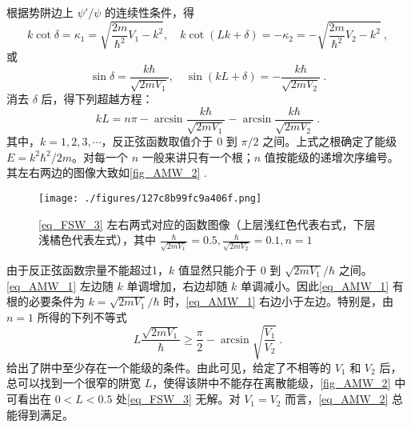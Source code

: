 根据势阱边上 $\psi'/\psi$ 的连续性条件，得
\begin{equation}
k\cot\delta=\kappa_1=\sqrt{\frac{2m}{\hbar^2}V_1-k^2},\quad k\cot(Lk+\delta)=-\kappa_2=-\sqrt{\frac{2m}{\hbar^2}V_2-k^2}~,
\end{equation}
或
\begin{equation}
\sin\delta=\frac{k\hbar}{\sqrt{2mV_1}},\quad\sin(kL+\delta)=-\frac{k\hbar}{\sqrt{2mV_2}}~.
\end{equation}
消去 $\delta$ 后，得下列超越方程：
\begin{equation}\label{eq_AMW_1}
kL=n\pi-\arcsin\frac{k\hbar}{\sqrt{2mV_1}}-\arcsin\frac{k\hbar}{\sqrt{2mV_2}}~.
\end{equation}
其中，$k=1,2,3,\cdots$，反正弦函数取值介于 $0$ 到 $\pi/2$ 之间。上式之根确定了能级 $E=k^2\hbar^2/2m$。对每一个 $n$ 一般来讲只有一个根；$n$ 值按能级的递增次序编号。其左右两边的图像大致如\autoref{fig_AMW_2} .
\begin{figure}[ht]
\centering
\texttt{[image: ./figures/127c8b99fc9a406f.png]}
\caption{\autoref{eq_FSW_3} 左右两式对应的函数图像（上层浅红色代表右式，下层浅橘色代表左式），其中 $\frac{\hbar}{\sqrt{2mV_1}}=0.5,\frac{\hbar}{\sqrt{2mV_2}}=0.1,n=1$} \label{fig_AMW_2}
\end{figure}
由于反正弦函数宗量不能超过1，$k$ 值显然只能介于 $0$ 到 $\sqrt{2mV_1}/\hbar$ 之间。\autoref{eq_AMW_1} 左边随 $k$ 单调增加，右边却随 $k$ 单调减小。因此\autoref{eq_AMW_1} 有根的必要条件为 $k=\sqrt{2mV_1}/\hbar$ 时，\autoref{eq_AMW_1} 右边小于左边。特别是，由 $n=1$ 所得的下列不等式
\begin{equation}\label{eq_AMW_2}
L\frac{\sqrt{2mV_1}}{\hbar}\geq\frac{\pi}{2}-\arcsin\sqrt{\frac{V_1}{V_2}}~.
\end{equation}
给出了阱中至少存在一个能级的条件。由此可见，给定了不相等的 $V_1$ 和 $V_2$ 后，总可以找到一个很窄的阱宽 $L$，使得该阱中不能存在离散能级，\autoref{fig_AMW_2} 中可看出在 $0<L<0.5$ 处\autoref{eq_FSW_3} 无解。对 $V_1=V_2$ 而言，\autoref{eq_AMW_2} 总能得到满足。